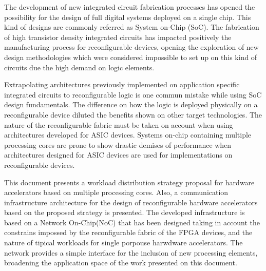 The development of new integrated circuit fabrication processes has opened the possibility for the design of full digital systems deployed on a single chip. This kind of designs are commonly referred as System on-Chip (SoC). The fabrication of high transistor density integrated circuits has impacted positively the manufacturing process for reconfigurable devices, opening the exploration of new design methodologies which were considered impossible to set up on this kind of circuits due the high demand on logic elements.

Extrapolating architectures previously implemented on application specific integrated circuits to reconfigurable logic is one commun mistake while using SoC design fundamentals. The difference on how the logic is deployed physically on a reconfigurable device diluted the benefits shown on other target technologies. The nature of the reconfigurable fabric must be taken on account when using architectures developed for ASIC devices. Systems on-chip containing multiple processing cores are prone to show drastic demises of performance when architectures designed for ASIC devices are used for implementations on reconfigurable devices.

This document presents a workload distribution strategy proposal for hardware accelerators based on multiple processing cores. Also, a communication infrastructure architecture for the design of reconfigurable hardware accelerators based on the proposed strategy is presented. The developed infrastructure is based on a Network On-Chip(NoC) that has been designed taking in account the constrains impossed by the reconfigurable fabric of the FPGA devices, and the nature of tipical \mbox{workloads} for single porpouse harwdware accelerators. The network provides a simple interface for the inclusion of new processing elements, broadening the application space of the work presented on this document.